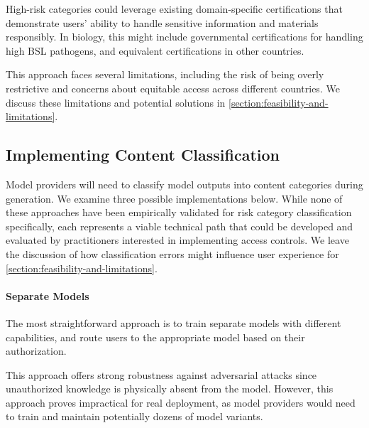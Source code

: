 \documentclass{article}
\theoremstyle{plain}
\theoremstyle{definition}
\theoremstyle{remark}
\begin{document}
High-risk categories could leverage existing domain-specific certifications that demonstrate users' ability to handle sensitive information and materials responsibly.
In biology, this might include governmental certifications for handling high BSL pathogens, and equivalent certifications in other countries.

This approach faces several limitations, including the risk of being overly restrictive and concerns about equitable access across different countries.
We discuss these limitations and potential solutions in \cref{section:feasibility-and-limitations}.

\subsection{Implementing Content Classification} \label{section:content-classification}

Model providers will need to classify model outputs into content categories during generation.
We examine three possible implementations below.
While none of these approaches have been empirically validated for risk category classification specifically, each represents a viable technical path that could be developed and evaluated by practitioners interested in implementing access controls.
We leave the discussion of how classification errors might influence user experience for \cref{section:feasibility-and-limitations}.

\paragraph{Separate Models}

The most straightforward approach is to train separate models with different capabilities, and route users to the appropriate model based on their authorization.

This approach offers strong robustness against adversarial attacks since unauthorized knowledge is physically absent from the model.
However, this approach proves impractical for real deployment, as model providers would need to train and maintain potentially dozens of model variants.
\end{document}
